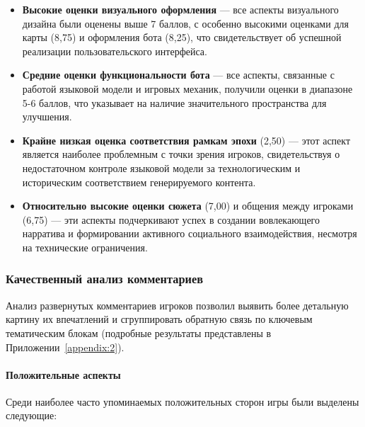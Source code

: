 \begin{itemize}
    \item \textbf{Высокие оценки визуального оформления} — все аспекты визуального дизайна были оценены выше 7 баллов, с особенно высокими оценками для карты (8,75) и оформления бота (8,25), что свидетельствует об успешной реализации пользовательского интерфейса.

    \item \textbf{Средние оценки функциональности бота} — все аспекты, связанные с работой языковой модели и игровых механик, получили оценки в диапазоне 5-6 баллов, что указывает на наличие значительного пространства для улучшения.

    \item \textbf{Крайне низкая оценка соответствия рамкам эпохи} (2,50) — этот аспект является наиболее проблемным с точки зрения игроков, свидетельствуя о недостаточном контроле языковой модели за технологическим и историческим соответствием генерируемого контента.

    \item \textbf{Относительно высокие оценки сюжета} (7,00) и общения между игроками (6,75) — эти аспекты подчеркивают успех в создании вовлекающего нарратива и формировании активного социального взаимодействия, несмотря на технические ограничения.
\end{itemize}

\subsubsection{Качественный анализ комментариев}

Анализ развернутых комментариев игроков позволил выявить более детальную картину их впечатлений и сгруппировать обратную связь по ключевым тематическим блокам (подробные результаты представлены в Приложении~\ref{appendix:2}).

\paragraph{Положительные аспекты}

Среди наиболее часто упоминаемых положительных сторон игры были выделены следующие:

